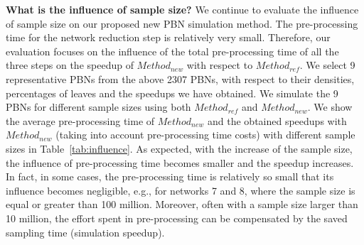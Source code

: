 \documentclass[runningheads,a4paper]{llncs}
\begin{document}
\medskip\noindent\textbf{What is the influence of sample size?}
We continue to evaluate the influence of sample size on our proposed new PBN simulation method.
The pre-processing time for the network reduction step is relatively very small. Therefore, our
evaluation focuses on the influence of the total pre-processing time of all the three steps on
the speedup of {\sf $Method_{new}$} with respect to {\sf $Method_{ref}$}. We select 9
representative PBNs from the above 2307 PBNs, with respect to their densities, percentages of
leaves and the speedups we have obtained.
We simulate the 9 PBNs for different sample sizes using both {\sf $Method_{ref}$} and
{\sf $Method_{new}$}. We show the average pre-processing time of {\sf $Method_{new}$}
and the obtained speedups with {\sf $Method_{new}$} (taking into account pre-processing time
costs) with different sample sizes in Table~\ref{tab:influence}.
As expected, with the increase of the sample size, the influence of pre-processing time becomes
smaller and the speedup increases. In fact, in some cases, the pre-processing time is relatively
so small that its influence becomes negligible, e.g., for networks 7 and 8, where the sample size
is equal or greater than 100 million.
Moreover, often with a sample size larger than 10 million,
the effort spent in pre-processing
can be compensated by the saved sampling time (simulation speedup).
\end{document}

